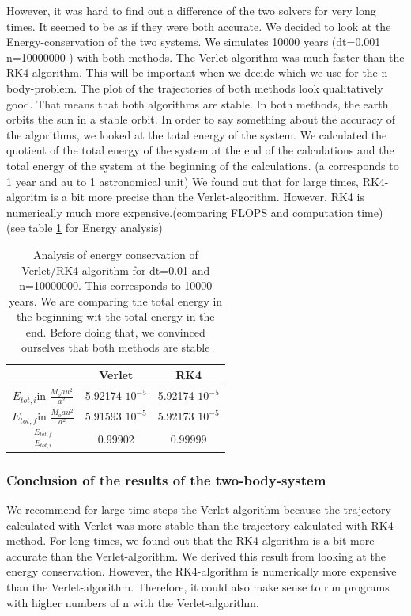 \documentclass[10pt,a4paper]{article}
\begin{document}
However, it was hard to find out a difference of the two solvers for very long times. It seemed to be as if they were both accurate. We decided to look at the Energy-conservation of the two systems. We simulates 10000 years (dt=0.001 n=10000000 ) with both methods. The Verlet-algorithm was much faster than the RK4-algorithm. This will be important when we decide which we use for the n-body-problem. 
The plot of the trajectories of both methods look qualitatively good. That means that both algorithms are stable. In both methods, the earth orbits the sun in a stable orbit. 
In order to say something about the accuracy of the algorithms, we looked at the total energy of the system. We calculated the quotient of the total energy of the system at the end of the calculations and the total energy of the system at the beginning of the calculations. (a corresponds to 1 year and au to 1 astronomical unit) We found out that for large times, RK4-algoritm is a bit more precise than the Verlet-algorithm. However, RK4 is numerically much more expensive.(comparing FLOPS and computation time) (see table \ref{TWOB_Energy_analysis} for Energy analysis) 
\begin{table}[h]
\centering
\caption{Analysis of energy conservation of Verlet/RK4-algorithm for dt=0.01 and n=10000000. This corresponds to 10000 years. We are comparing the total energy in the beginning wit the total energy in the end. Before doing that, we convinced ourselves that both methods are stable \label{TWOB_Energy_analysis}}
\begin{tabular}{c|c|c}
&Verlet & RK4 \\
\hline \hline
$E_{tot,i}$in $\frac{M_o au^2}{a^2}$ &5.92174 $10^{-5}$ &5.92174 $10^{-5}$ \\
$E_{tot,f}$in $\frac{M_o au^2}{a^2}$ &5.91593 $10^{-5}$ &5.92173 $10^{-5}$ \\
\hline
$\frac{E_{tot,f}}{E_{tot,i}}$ & 0.99902& 0.99999\\
\end{tabular}
\end{table}

\subsubsection{Conclusion of the results of the two-body-system}

We recommend for large time-steps the Verlet-algorithm because the trajectory calculated with Verlet was more stable than the trajectory calculated with RK4-method. 
For long times, we found out that the RK4-algorithm is a bit more accurate than the Verlet-algorithm. We derived this result from looking at the energy conservation. However, the RK4-algorithm is numerically more expensive than the Verlet-algorithm. Therefore, it could also make sense to run programs with higher numbers of n with the Verlet-algorithm.
\end{document}
